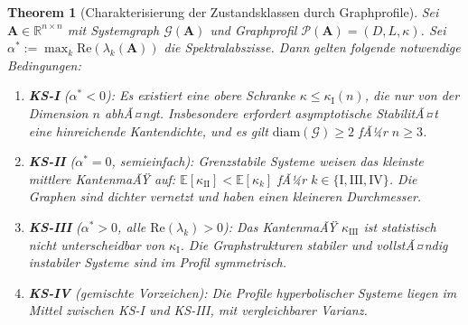 ﻿\documentclass[12pt, a4paper, titlepage]{report}
\newtheorem{theorem}{Theorem}[section]
\theoremstyle{definition}
\theoremstyle{remark}
\newcommand{\R}{\mathbb{R}}
\newcommand{\vA}{\bm{A}}
\newcommand{\re}{\mathrm{Re}}
\begin{document}
\begin{theorem}[Charakterisierung der Zustandsklassen durch Graphprofile]
\label{thm:ks_graphprofil}
Sei $\vA \in \R^{n \times n}$ mit Systemgraph $\mathcal{G}(\vA)$ und Graphprofil
$\mathcal{P}(\vA) = (D, L, \kappa)$. Sei $\alpha^* := \max_k \re(\lambda_k(\vA))$
die Spektralabszisse. Dann gelten folgende notwendige Bedingungen:
\begin{enumerate}[label=(\roman*)]
  \item \textbf{KS-I} ($\alpha^* < 0$): Es existiert eine obere Schranke
    $\kappa \leq \kappa_{\mathrm{I}}(n)$, die nur von der Dimension $n$ abhÃ¤ngt.
    Insbesondere erfordert asymptotische StabilitÃ¤t eine hinreichende Kantendichte,
    und es gilt $\mathrm{diam}(\mathcal{G}) \geq 2$ fÃ¼r $n \geq 3$.
  \item \textbf{KS-II} ($\alpha^* = 0$, semieinfach): Grenzstabile Systeme weisen
    das kleinste mittlere KantenmaÃŸ auf: $\mathbb{E}[\kappa_{\mathrm{II}}] <
    \mathbb{E}[\kappa_k]$ fÃ¼r $k \in \{\mathrm{I}, \mathrm{III}, \mathrm{IV}\}$.
    Die Graphen sind dichter vernetzt und haben einen kleineren Durchmesser.
  \item \textbf{KS-III} ($\alpha^* > 0$, alle $\re(\lambda_k) > 0$): Das KantenmaÃŸ
    $\kappa_{\mathrm{III}}$ ist statistisch nicht unterscheidbar von $\kappa_{\mathrm{I}}$.
    Die Graph\-strukturen stabiler und vollstÃ¤ndig instabiler Systeme sind im Profil
    symmetrisch.
  \item \textbf{KS-IV} (gemischte Vorzeichen): Die Profile hyperbolischer Systeme
    liegen im Mittel zwischen KS-I und KS-III, mit vergleichbarer Varianz.
\end{enumerate}
\end{theorem}
\end{document}
